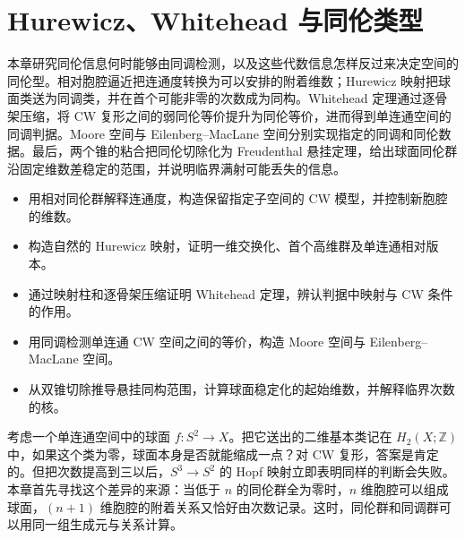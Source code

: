 
% 
% 

\chapter{Hurewicz、Whitehead 与同伦类型}
\label{g2:ch:09}

\begin{chapterabstract}
	本章研究同伦信息何时能够由同调检测，以及这些代数信息怎样反过来决定空间的同伦型。相对胞腔逼近把连通度转换为可以安排的附着维数；Hurewicz 映射把球面类送为同调类，并在首个可能非零的次数成为同构。Whitehead 定理通过逐骨架压缩，将 CW 复形之间的弱同伦等价提升为同伦等价，进而得到单连通空间的同调判据。Moore 空间与 Eilenberg–MacLane 空间分别实现指定的同调和同伦数据。最后，两个锥的粘合把同伦切除化为 Freudenthal 悬挂定理，给出球面同伦群沿固定维数差稳定的范围，并说明临界满射可能丢失的信息。
\end{chapterabstract}

\begin{learninggoals}
	\begin{itemize}
		\item 用相对同伦群解释连通度，构造保留指定子空间的 CW 模型，并控制新胞腔的维数。
		\item 构造自然的 Hurewicz 映射，证明一维交换化、首个高维群及单连通相对版本。
		\item 通过映射柱和逐骨架压缩证明 Whitehead 定理，辨认判据中映射与 CW 条件的作用。
		\item 用同调检测单连通 CW 空间之间的等价，构造 Moore 空间与 Eilenberg–MacLane 空间。
		\item 从双锥切除推导悬挂同构范围，计算球面稳定化的起始维数，并解释临界次数的核。
	\end{itemize}
\end{learninggoals}

考虑一个单连通空间中的球面 \(f:S^2\to X\)。把它送出的二维基本类记在 \(H_2(X;\mathbb Z)\) 中，如果这个类为零，球面本身是否就能缩成一点？对 CW 复形，答案是肯定的。但把次数提高到三以后，\(S^3\to S^2\) 的 Hopf 映射立即表明同样的判断会失败。本章首先寻找这个差异的来源：当低于 \(n\) 的同伦群全为零时，\(n\) 维胞腔可以组成球面，\((n+1)\) 维胞腔的附着关系又恰好由次数记录。这时，同伦群和同调群可以用同一组生成元与关系计算。


